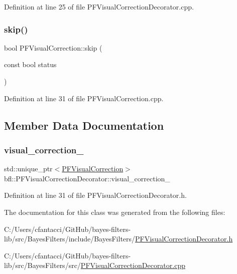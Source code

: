 Definition at line 25 of file P\+F\+Visual\+Correction\+Decorator.\+cpp.

\mbox{\label{classbfl_1_1PFVisualCorrection_afbe70e2ab0be5459c79fe4eabd27cf9f}} 
\subsubsection{\texorpdfstring{skip()}{skip()}}
{\footnotesize\ttfamily bool P\+F\+Visual\+Correction\+::skip (\begin{DoxyParamCaption}\item[{const bool}]{status }\end{DoxyParamCaption})\hspace{0.3cm}{\ttfamily [inherited]}}



Definition at line 31 of file P\+F\+Visual\+Correction.\+cpp.



\subsection{Member Data Documentation}
\mbox{\label{classbfl_1_1PFVisualCorrectionDecorator_ae8d8e4e54e4b78b51f69a6a469d269f6}} 
\subsubsection{\texorpdfstring{visual\+\_\+correction\+\_\+}{visual\_correction\_}}
{\footnotesize\ttfamily std\+::unique\+\_\+ptr$<$\mbox{\hyperlink{classbfl_1_1PFVisualCorrection}{P\+F\+Visual\+Correction}}$>$ bfl\+::\+P\+F\+Visual\+Correction\+Decorator\+::visual\+\_\+correction\+\_\+\hspace{0.3cm}{\ttfamily [private]}}



Definition at line 31 of file P\+F\+Visual\+Correction\+Decorator.\+h.



The documentation for this class was generated from the following files\+:\begin{DoxyCompactItemize}
\item 
C\+:/\+Users/cfantacci/\+Git\+Hub/bayes-\/filters-\/lib/src/\+Bayes\+Filters/include/\+Bayes\+Filters/\mbox{\hyperlink{PFVisualCorrectionDecorator_8h}{P\+F\+Visual\+Correction\+Decorator.\+h}}\item 
C\+:/\+Users/cfantacci/\+Git\+Hub/bayes-\/filters-\/lib/src/\+Bayes\+Filters/src/\mbox{\hyperlink{PFVisualCorrectionDecorator_8cpp}{P\+F\+Visual\+Correction\+Decorator.\+cpp}}\end{DoxyCompactItemize}

